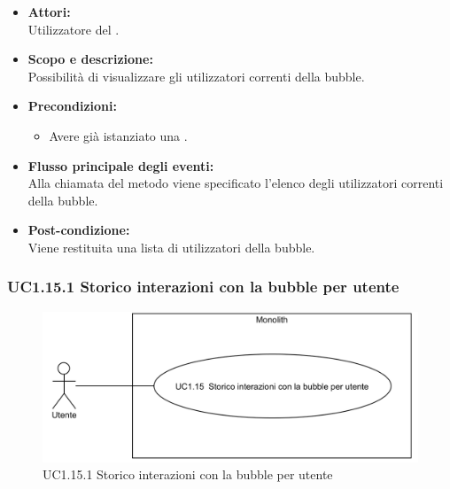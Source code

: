 \begin{itemize}
	\item \textbf{Attori:}
	\\Utilizzatore del .
	\item \textbf{Scopo e descrizione:} 
	\\Possibilità di visualizzare gli utilizzatori correnti della bubble.
	\item \textbf{Precondizioni:}
	\begin{itemize}
		\item Avere già istanziato una .
	\end{itemize}
	\item \textbf{Flusso principale degli eventi:}
	\\Alla chiamata del metodo viene specificato l’elenco degli utilizzatori correnti della bubble.
	\item \textbf{Post-condizione:}
	\\Viene restituita una lista di utilizzatori della bubble.
\end{itemize}

\subsubsection{UC1.15.1 Storico interazioni con la bubble per utente} \label{UC1.15.1}

\begin{figure}[H]
	\centering
	\includegraphics[width=15cm]{../../documenti/AnalisiDeiRequisiti/Diagrammi_img/uc1_15.png}
	\caption{UC1.15.1 Storico interazioni con la bubble per utente}
\end{figure}

